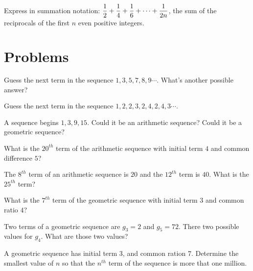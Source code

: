 \begin{exer}
 Express in summation notation: $\displaystyle {1\over2}+{1\over4}+{1\over6}+
\cdots+{1\over{2n}}$, the sum of the reciprocals of the first $n$ even
positive integers.
 \end{exer}
 
 \clearpage
 
\section{Problems}

\begin{prob} 
Guess the next term in the sequence $1, 3, 5, 7, 8, 9\cdots$. What's
another possible answer?
\end{prob}

\begin{prob}
Guess the next term in the sequence $1, 2, 2, 3, 2, 4, 2, 4, 3\cdots$.
\end{prob}

\begin{prob}
A sequence begins $1, 3, 9, 15$. Could it be an arithmetic sequence?
Could it be a geometric sequence?
\end{prob}

\begin{prob}
What is the $20^{th}$ term of the arithmetic sequence with initial
term $4$ and common difference $5$?
\end{prob}

\begin{prob}
The $8^{th}$ term of an arithmetic sequence is $20$
and the $12^{th}$ term is $40$. What is the $25^{th}$ term?
\end{prob}

\begin{prob} 
 What is the $7^{th}$ term of the geometric sequence with initial
term $3$ and common ratio $4$?
\end{prob}

\begin{prob}
Two terms of a geometric sequence are $g_3=2$ and $g_5=72$. There two possible
values for $g_4$. What are those two values?
\end{prob}

\begin{prob}
A geometric sequence has initial term $3$, and common ration $7$. Determine the smallest value of $n$
so that the $n^{th}$ term of the sequence is more that one million.
\end{prob}

